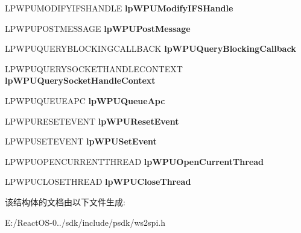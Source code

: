 \begin{DoxyCompactItemize}
\mbox{\label{struct___w_s_p_u_p_c_a_l_l_t_a_b_l_e_a42c7568fe39d0153af2dac1756bfb8f8}} 
L\+P\+W\+P\+U\+M\+O\+D\+I\+F\+Y\+I\+F\+S\+H\+A\+N\+D\+LE {\bfseries lp\+W\+P\+U\+Modify\+I\+F\+S\+Handle}
\item 
\mbox{\label{struct___w_s_p_u_p_c_a_l_l_t_a_b_l_e_afa1e472a07a71486e8c610645f03c0de}} 
L\+P\+W\+P\+U\+P\+O\+S\+T\+M\+E\+S\+S\+A\+GE {\bfseries lp\+W\+P\+U\+Post\+Message}
\item 
\mbox{\label{struct___w_s_p_u_p_c_a_l_l_t_a_b_l_e_a1c8fbb022e1414653221ed0571fdebb4}} 
L\+P\+W\+P\+U\+Q\+U\+E\+R\+Y\+B\+L\+O\+C\+K\+I\+N\+G\+C\+A\+L\+L\+B\+A\+CK {\bfseries lp\+W\+P\+U\+Query\+Blocking\+Callback}
\item 
\mbox{\label{struct___w_s_p_u_p_c_a_l_l_t_a_b_l_e_a0be38850a45bae3378858fa6544882c3}} 
L\+P\+W\+P\+U\+Q\+U\+E\+R\+Y\+S\+O\+C\+K\+E\+T\+H\+A\+N\+D\+L\+E\+C\+O\+N\+T\+E\+XT {\bfseries lp\+W\+P\+U\+Query\+Socket\+Handle\+Context}
\item 
\mbox{\label{struct___w_s_p_u_p_c_a_l_l_t_a_b_l_e_a145d7e73ea5ea4906e92352d594ba86a}} 
L\+P\+W\+P\+U\+Q\+U\+E\+U\+E\+A\+PC {\bfseries lp\+W\+P\+U\+Queue\+Apc}
\item 
\mbox{\label{struct___w_s_p_u_p_c_a_l_l_t_a_b_l_e_a99cbb5cafb7e392ecde988481c2b3419}} 
L\+P\+W\+P\+U\+R\+E\+S\+E\+T\+E\+V\+E\+NT {\bfseries lp\+W\+P\+U\+Reset\+Event}
\item 
\mbox{\label{struct___w_s_p_u_p_c_a_l_l_t_a_b_l_e_a2dfb5d5d3741f858872ba82242ff297b}} 
L\+P\+W\+P\+U\+S\+E\+T\+E\+V\+E\+NT {\bfseries lp\+W\+P\+U\+Set\+Event}
\item 
\mbox{\label{struct___w_s_p_u_p_c_a_l_l_t_a_b_l_e_a5831fa0768f9f7bc87cdd75bf6ca7a23}} 
L\+P\+W\+P\+U\+O\+P\+E\+N\+C\+U\+R\+R\+E\+N\+T\+T\+H\+R\+E\+AD {\bfseries lp\+W\+P\+U\+Open\+Current\+Thread}
\item 
\mbox{\label{struct___w_s_p_u_p_c_a_l_l_t_a_b_l_e_ae616adf4a6ca7b6ec33752d55df6e70b}} 
L\+P\+W\+P\+U\+C\+L\+O\+S\+E\+T\+H\+R\+E\+AD {\bfseries lp\+W\+P\+U\+Close\+Thread}
\end{DoxyCompactItemize}


该结构体的文档由以下文件生成\+:\begin{DoxyCompactItemize}
\item 
E\+:/\+React\+O\+S-\/0../sdk/include/psdk/ws2spi.\+h\end{DoxyCompactItemize}
